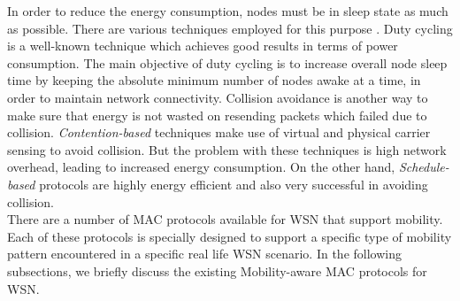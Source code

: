 \documentclass[a4paper, conference, 10pt]{IEEEtran}
\begin{document}
In order to reduce the energy consumption, nodes must be in sleep state as much as possible. There are various techniques employed for this purpose \cite{eeff_tech}. Duty cycling is a well-known technique which achieves good results in terms of power consumption. The main objective of duty cycling is to increase overall node sleep time by keeping the absolute minimum number of nodes awake at a time, in order to maintain network connectivity. Collision avoidance is another way to make sure that energy is not wasted on resending packets which failed due to collision. \emph{Contention-based} techniques make use of virtual and physical carrier sensing to avoid collision. But the problem with these techniques is high network overhead, leading to increased energy consumption. On the other hand, \emph{Schedule-based} protocols are highly energy efficient and also very successful in avoiding collision. \\

There are a number of MAC protocols available for WSN that support mobility. Each of these protocols is specially designed to support a specific type of mobility pattern encountered in a specific real life WSN scenario. { \color{red} In the following subsections, we briefly discuss the existing Mobility-aware MAC protocols for WSN.\\}
\end{document}
